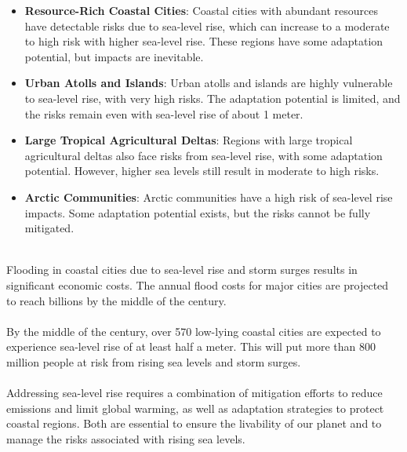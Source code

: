 \documentclass[../summary.tex]{subfiles}
\begin{document}
\begin{itemize}
	\item \textbf{Resource-Rich Coastal Cities}: Coastal cities with abundant resources have detectable risks due to sea-level rise, which can increase to a moderate to high risk with higher sea-level rise. These regions have some adaptation potential, but impacts are inevitable.
	\item \textbf{Urban Atolls and Islands}: Urban atolls and islands are highly vulnerable to sea-level rise, with very high risks. The adaptation potential is limited, and the risks remain even with sea-level rise of about 1 meter.
	\item \textbf{Large Tropical Agricultural Deltas}: Regions with large tropical agricultural deltas also face risks from sea-level rise, with some adaptation potential. However, higher sea levels still result in moderate to high risks.
	\item \textbf{Arctic Communities}: Arctic communities have a high risk of sea-level rise impacts. Some adaptation potential exists, but the risks cannot be fully mitigated.
\end{itemize}
\ \\
Flooding in coastal cities due to sea-level rise and storm surges results in significant economic costs. The annual flood costs for major cities are projected to reach billions by the middle of the century.\\
\\
By the middle of the century, over 570 low-lying coastal cities are expected to experience sea-level rise of at least half a meter. This will put more than 800 million people at risk from rising sea levels and storm surges.\\
\\
Addressing sea-level rise requires a combination of mitigation efforts to reduce emissions and limit global warming, as well as adaptation strategies to protect coastal regions. Both are essential to ensure the livability of our planet and to manage the risks associated with rising sea levels.
\end{document}
